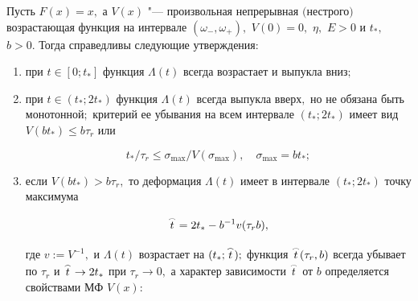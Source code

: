 \begin{theorem}[2] \label{kho:teo2} Пусть $F(x)=x,$ а $V(x)$ "--- произвольная непрерывная $($не\-стро\-го$)$ возрастающая функция на интервале $(\omega_{-},\omega_{+}),$ $V(0)=0,$ $\eta,$ $E>0$ и $t_\ast,$ $b>0.$ Тогда справедливы следующие утверждения\/$:$

\begin{enumerate}

\item [\rm 1)] \hypertarget{kh:2p1}{} при $t\in[0;t_\ast]$ функция $\Lambda(t)$ всегда возрастает и выпукла вниз$;$



\hypertarget{kh:2p2}{}

\item [\rm 2)] при $t\in(t_\ast;2t_\ast)$ функция $\Lambda(t)$ всегда выпукла вверх$,$ но не обязана быть монотонной$;$ критерий ее убывания на всем интервале $(t_\ast;2t_\ast)$ имеет вид $V(bt_\ast)\le b\tau_r$ или 

\begin{equation}

\label{kho:eq16}

t_\ast/\tau_r\le\sigma_{\max}/V(\sigma_{\max}), \quad \sigma_{\max}=bt_\ast;

\end{equation}



\hypertarget{kh:2p3}{}

\item [\rm 3)] если $V(bt_\ast)>b\tau_r,$ то деформация $\Lambda(t)$ имеет в интервале $(t_\ast;2t_\ast)$ точку максимума 

\begin{equation}

\label{kho:eq17}

\mathord{\buildrel{\lower3pt\hbox{$\scriptscriptstyle\frown$}}\over{t}}=2t_\ast-b^{-1}v(\tau_r b),

\end{equation}

где $v:=V^{-1},$ и $\Lambda(t)$ возрастает на $(t_\ast;\mathord{\buildrel{\lower3pt\hbox{$\scriptscriptstyle\frown$}}\over{t}});$  функция $\mathord{\buildrel{\lower3pt\hbox{$\scriptscriptstyle\frown$}}\over {t}}(\tau_r,b)$ всегда убывает по $\tau_r$ и $\mathord{\buildrel{\lower3pt\hbox{$\scriptscriptstyle\frown$}}\over{t}}\to2t_\ast$ при $\tau_r\to0,$ а характер зависимости $\mathord{\buildrel{\lower3pt\hbox{$\scriptscriptstyle\frown$}}\over{t}}$ от $b$ определяется свойствами МФ $V(x){:}$


\end{enumerate}
\end{theorem}
